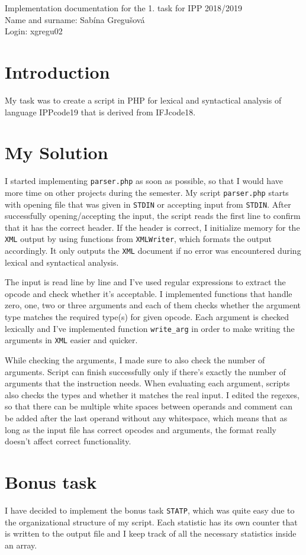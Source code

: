 \documentclass[10pt, a4paper]{article}
\begin{document}
\begin{center}
Implementation documentation for the 1. task for IPP 2018/2019\\
Name and surname: Sabína Gregušová\\
Login: xgregu02
\end{center}

\section*{Introduction}
My task was to create a script  in PHP for lexical and syntactical analysis of language IPPcode19 that is derived from IFJcode18.

\section*{My Solution}

I started implementing \texttt{parser.php} as soon as possible, so that I would have more time on other projects during the semester. My script \texttt{parser.php} starts with opening file that was given in \texttt{STDIN} or accepting input from \texttt{STDIN}. After successfully opening/accepting the input, the script reads the first line to confirm that it has the correct header. If the header is correct, I initialize memory for the \texttt{XML} output by using functions from \texttt{XMLWriter}, which formats the output accordingly. It only outputs the \texttt{XML} document if no error was encountered during lexical and syntactical analysis.



The input is read line by line and I've used regular expressions to extract the opcode and check whether it's acceptable. I implemented functions that handle zero, one, two or three arguments and each of them checks whether the argument type matches the required type(s) for given opcode. Each argument is checked lexically and I've implemented function \texttt{write\_arg} in order to make writing the arguments in \texttt{XML} easier and quicker.



While checking the arguments, I made sure to also check the number of arguments. Script can finish successfully only if there's exactly the number of arguments that the instruction needs. When evaluating each argument, scripts also checks the types and whether it matches the real input. I edited the regexes, so that there can be multiple white spaces between operands and comment can be added after the last operand without any whitespace, which means that as long as the input file has correct opcodes and arguments, the format really doesn't affect correct functionality.

\section*{Bonus task}
 I have decided to implement the bonus task \texttt{STATP}, which was quite easy due to the organizational structure of my script. Each statistic has its own counter that is written to the output file and I keep track of all the necessary statistics inside an array.
\end{document}
